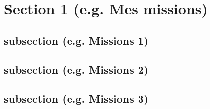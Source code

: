\section{Section 1 (e.g. Mes missions)}

\lipsum[1]

\subsection{subsection (e.g. Missions 1)}

\lipsum[2]

\subsection{subsection (e.g.  Missions 2)}

\lipsum[2]

\subsection{subsection (e.g. Missions 3)}

\lipsum[2]